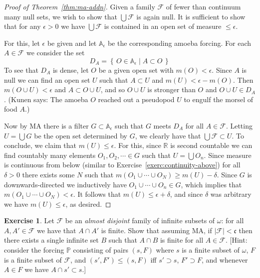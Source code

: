 \documentclass[11pt,oneside]{amsbook}
\newcommand{\set}[1]{\left\{\,#1\,\right\}}
\newcommand{\PP}{\mathbb P}
\theoremstyle{definition}
\newtheorem{exercise}{Exercise}[section]
\theoremstyle{plain}
\theoremstyle{definition}
\theoremstyle{remark}
\numberwithin{equation}{section}
\numberwithin{figure}{section}
\begin{document}
\begin{proof}[Proof of Theorem~\ref{thm:ma-addn}]
  Given a family $\mathcal F$ of fewer than continuum many null sets, we wish to show that $\bigcup\mathcal F$ is again null. It is sufficient to show that for any $\epsilon>0$ we have $\bigcup\mathcal F$ is contained in an open set of measure $\leq\epsilon$.

  For this, let $\epsilon$ be given and let $\mathbb A_\epsilon$ be the corresponding amoeba forcing. For each $A\in\mathcal F$ we consider the set
  \[D_A=\set{O\in\mathbb A_\epsilon\mid A\subset O}
  \]
  To see that $D_A$ is dense, let $O$ be a given open set with $m(O)<\epsilon$. Since $A$ is null we can find an open set $U$ such that $A\subset U$ and $m(U)<\epsilon-m(O)$. Then $m(O\cup U)<\epsilon$ and $A\subset O\cup U$, and so $O\cup U$ is stronger than $O$ and $O\cup U\in D_A$. (Kunen says: The amoeba $O$ reached out a pseudopod $U$ to engulf the morsel of food $A$.)

  Now by MA there is a filter $G\subset\mathbb A_\epsilon$ such that $G$ meets $D_A$ for all $A\in\mathcal F$. Letting $U=\bigcup G$ be the open set determined by $G$, we clearly have that $\bigcup\mathcal F\subset U$. To conclude, we claim that $m(U)\leq\epsilon$. For this, since $\mathbb R$ is second countable we can find countably many elements $O_1,O_2,\cdots\in G$ such that $U=\bigcup O_n$. Since measure is continuous from below (similar to Exercise~\ref{exerc:continuity-above}) for all $\delta>0$ there exists some $N$ such that $m(O_1\cup\cdots\cup O_N)\geq m(U)-\delta$. Since $G$ is downwards-directed we inductively have $O_1\cup\cdots\cup O_n\in G$, which implies that $m(O_1\cup\cdots\cup O_N)<\epsilon$. It follows that $m(U)\leq\epsilon+\delta$, and since $\delta$ was arbitrary we have $m(U)\leq\epsilon$, as desired.
\end{proof}

\begin{exercise}
  Let $\mathcal F$ be an \emph{almost disjoint} family of infinite subsets of $\omega$: for all $A,A'\in\mathcal F$ we have that $A\cap A'$ is finite. Show that assuming MA, if $|\mathcal F|<\mathfrak c$ then there exists a single infinite set $B$ such that $A\cap B$ is finite for all $A\in\mathcal F$. [Hint: consider the forcing $\PP$ consisting of pairs $(s,F)$ where $s$ is a finite subset of $\omega$, $F$ is a finite subset of $\mathcal F$, and $(s',F')\leq(s,F)$ iff $s'\supset s$, $F'\supset F$, and whenever $A\in F$ we have $A\cap s'\subset s$.]
\end{exercise}
\end{document}
